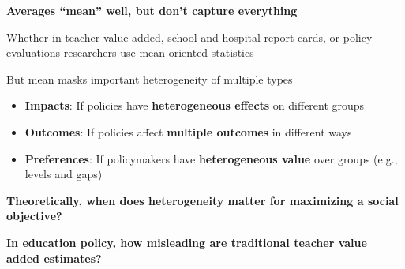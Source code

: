 \documentclass[t,aspectratio=169,11pt,presentation]{beamer}
\newenvironment{wideitemize}{\itemize\addtolength{\itemsep}{14pt}}{\enditemize}
\begin{document}
\begin{frame}{\textbf{Averages ``mean'' well, but don't capture everything} }

\begin{wideitemize}
    \item Whether in teacher value added, school and hospital report cards, or policy evaluations researchers use mean-oriented statistics


    
    \item <2-> But mean masks important heterogeneity of multiple types
    \begin{itemize}
        \item<3->\textbf{Impacts}: If policies have \textbf{heterogeneous effects} on different groups 
        \item<4->\textbf{Outcomes}: If policies affect \textbf{multiple outcomes} in different ways
        \item<5->\textbf{Preferences}: If policymakers have \textbf{heterogeneous value} over groups (e.g., levels and gaps)
    \end{itemize}

    
    \item<6-> \textbf{\color{ptr5}Theoretically, when does heterogeneity matter for maximizing a social objective?}
  
    \item<7>  \textbf{\color{ptr5}In education policy, how misleading are traditional teacher value added estimates?}
  
\end{wideitemize}

\end{frame}
\end{document}
